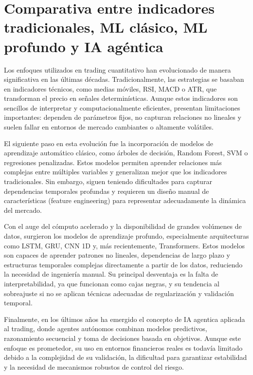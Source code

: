 \section{Comparativa entre indicadores tradicionales, ML clásico, ML profundo y IA agéntica}

Los enfoques utilizados en trading cuantitativo han evolucionado de manera significativa en las últimas décadas. Tradicionalmente, las estrategias se basaban en indicadores técnicos, como medias móviles, RSI, MACD o ATR, que transforman el precio en señales determinísticas. Aunque estos indicadores son sencillos de interpretar y computacionalmente eficientes, presentan limitaciones importantes: dependen de parámetros fijos, no capturan relaciones no lineales y suelen fallar en entornos de mercado cambiantes o altamente volátiles.

El siguiente paso en esta evolución fue la incorporación de modelos de aprendizaje automático clásico, como árboles de decisión, Random Forest, SVM o regresiones penalizadas. Estos modelos permiten aprender relaciones más complejas entre múltiples variables y generalizan mejor que los indicadores tradicionales. Sin embargo, siguen teniendo dificultades para capturar dependencias temporales profundas y requieren un diseño manual de características (feature engineering) para representar adecuadamente la dinámica del mercado.

Con el auge del cómputo acelerado y la disponibilidad de grandes volúmenes de datos, surgieron los modelos de aprendizaje profundo, especialmente arquitecturas como LSTM, GRU, CNN 1D y, más recientemente, Transformers. Estos modelos son capaces de aprender patrones no lineales, dependencias de largo plazo y estructuras temporales complejas directamente a partir de los datos, reduciendo la necesidad de ingeniería manual. Su principal desventaja es la falta de interpretabilidad, ya que funcionan como cajas negras, y su tendencia al sobreajuste si no se aplican técnicas adecuadas de regularización y validación temporal.

Finalmente, en los últimos años ha emergido el concepto de IA agentica aplicada al trading, donde agentes autónomos combinan modelos predictivos, razonamiento secuencial y toma de decisiones basada en objetivos. Aunque este enfoque es prometedor, su uso en entornos financieros reales es todavía limitado debido a la complejidad de su validación, la dificultad para garantizar estabilidad y la necesidad de mecanismos robustos de control del riesgo.